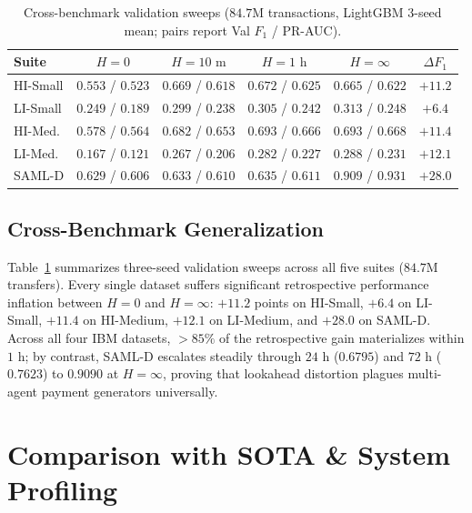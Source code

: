 \documentclass[sigconf,nonacm]{acmart}
\begin{document}
\begin{table}[t]
\centering
\caption{Cross-benchmark validation sweeps ($84.7\text{M}$ transactions, LightGBM 3-seed mean; pairs report Val $F_1$ / PR-AUC).}
\label{tab:cross_benchmark}
\scriptsize
\setlength{\tabcolsep}{2.2pt}
\begin{tabular}{lccccc}
\toprule
\textbf{Suite} & \textbf{$H = 0$} & \textbf{$H = 10\text{ m}$} & \textbf{$H = 1\text{ h}$} & \textbf{$H = \infty$} & \textbf{$\Delta F_1$} \\
\midrule
HI-Small & $0.553$ / $0.523$ & $0.669$ / $0.618$ & $0.672$ / $0.625$ & $0.665$ / $0.622$ & $+11.2$ \\
LI-Small & $0.249$ / $0.189$ & $0.299$ / $0.238$ & $0.305$ / $0.242$ & $0.313$ / $0.248$ & $+6.4$ \\
HI-Med. & $0.578$ / $0.564$ & $0.682$ / $0.653$ & $0.693$ / $0.666$ & $0.693$ / $0.668$ & $+11.4$ \\
LI-Med. & $0.167$ / $0.121$ & $0.267$ / $0.206$ & $0.282$ / $0.227$ & $0.288$ / $0.231$ & $+12.1$ \\
SAML-D & $0.629$ / $0.606$ & $0.633$ / $0.610$ & $0.635$ / $0.611$ & $0.909$ / $0.931$ & $+28.0$ \\
\bottomrule
\end{tabular}
\end{table}

\subsection{Cross-Benchmark Generalization}
Table~\ref{tab:cross_benchmark} summarizes three-seed validation sweeps across all five suites ($84.7\text{M}$ transfers). Every single dataset suffers significant retrospective performance inflation between $H = 0$ and $H = \infty$: $+11.2$ points on HI-Small, $+6.4$ on LI-Small, $+11.4$ on HI-Medium, $+12.1$ on LI-Medium, and $+28.0$ on SAML-D. Across all four IBM datasets, $>85\%$ of the retrospective gain materializes within $1\text{ h}$; by contrast, SAML-D escalates steadily through $24\text{ h}$ ($0.6795$) and $72\text{ h}$ ($0.7623$) to $0.9090$ at $H = \infty$, proving that lookahead distortion plagues multi-agent payment generators universally.

\section{Comparison with SOTA \& System Profiling}
\label{sec:ablations}
\end{document}

